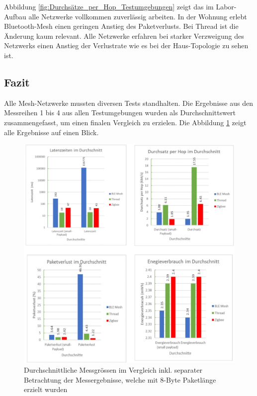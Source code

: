 Abbildung \ref{fig:Durchsätze_per_Hop_Testumgebungen} zeigt das im Labor-Aufbau alle Netzwerke vollkommen zuverlässig arbeiten. In der Wohnung erlebt Bluetooth-Mesh einen geringen Anstieg des Paketverlusts. Bei Thread ist die Änderung kaum relevant. Alle Netzwerke erfahren bei starker Verzweigung des Netzwerks einen Anstieg der Verlustrate wie es bei der Haus-Topologie zu sehen ist. 


\subsection{Fazit}\label{subsec:FazitVergleich}
Alle Mesh-Netzwerke mussten diversen Tests standhalten. Die Ergebnisse aus den Messreihen 1 bis 4 aus allen Testumgebungen wurden als Durchschnittswert zusammengefasst, um einen finalen Vergleich zu erzielen. Die Abbildung \ref{fig:Messresultate_Fazit} zeigt alle Ergebnisse auf einen Blick.

\begin{figure}[h]
	\centering
	\includegraphics[width=1.0\textwidth]{graphics/Messresultate_Fazit.jpg}
	\caption{Durchschnittliche Messgrössen im Vergleich inkl. separater Betrachtung der Messergebnisse, welche mit 8-Byte Paketlänge erzielt wurden}\label{fig:Messresultate_Fazit}
\end{figure}

